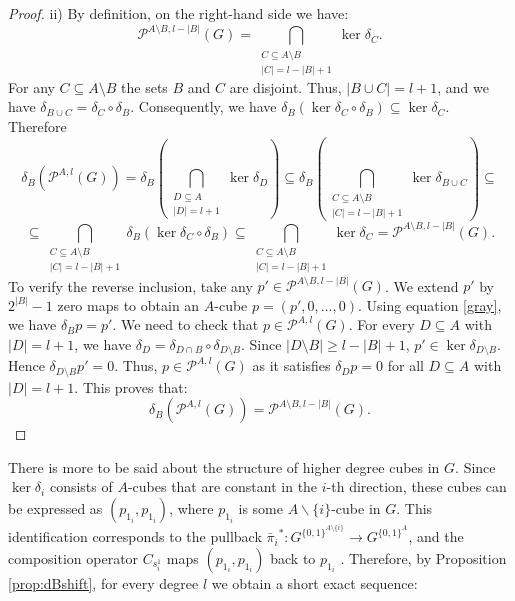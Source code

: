 \documentclass{amsart}
\theoremstyle{definition}
\theoremstyle{remark}
\numberwithin{equation}{section}
\begin{document}
\begin{proof}
ii) By definition, on the right-hand side we have:
$$ \mathcal{P}^{A\setminus B,l -|B|}(G) =  \bigcap_{\substack{C \subseteq A \setminus B \\  |C|=l-|B| +1}} \ker \delta_C.$$
For any $C \subseteq A\setminus B$ the sets $B$ and $C$ are disjoint. Thus, $|B \cup C|=l +1$, and we have $\delta_{B \cup C} = \delta_C \circ \delta_B$. Consequently, we have $\delta_B(\ker \delta_C \circ \delta_B) \subseteq \ker \delta_C$.
Therefore 
$$\delta_B \left(\mathcal{P}^{A,l}(G)\right) = \delta_B \left(  \bigcap_{\substack{D \subseteq A \\  |D|=l +1}} \ker \delta_{D} \right) \subseteq  \delta_B \left( \bigcap_{\substack{C \subseteq A \setminus B \\  |C|=l-|B| +1}} \ker \delta_{B \cup C} \right) \subseteq$$
$$\subseteq \bigcap_{\substack{C \subseteq A \setminus B \\  |C|=l-|B| +1}} \delta_B(\ker \delta_C \circ \delta_B) 
\subseteq \bigcap_{\substack{C \subseteq A \setminus B \\  |C|=l-|B| +1}} \ker \delta_C =  \mathcal{P}^{A\setminus B,l -|B|}(G).$$
To verify the reverse inclusion, take any $p' \in  \mathcal{P}^{A\setminus B,l -|B|}(G)$. We extend $p'$  by $2^{|B|}-1$ zero maps to obtain an  $A$-cube $p=(p', 0, \dots, 0)$. Using equation \eqref{gray}, we have $\delta_B p = p'$. We need to check that  $p \in \mathcal{P}^{A,l}(G)$. For every $D\subseteq A$ with $|D|=l+1$, we have $\delta_D= \delta_{D \cap B}\circ\delta_{D\setminus B}$.  Since $|D\setminus B|\ge l - |B| + 1$, $p' \in \ker \delta_{D\setminus B}$. Hence $\delta_{D\setminus B} p' = 0 $. Thus, $p \in \mathcal{P}^{A, l}(G)$ as it satisfies $ \delta_D p = 0$ for all $D \subseteq A$ with $|D| = l + 1$.
This proves that:
\[
\delta_B \left(\mathcal{P}^{A, l}(G)\right) = \mathcal{P}^{A \setminus B, l - |B|}(G).
\]

\end{proof}

There is more to be said about the structure of higher degree cubes in $G$.
Since $\ker \delta_i$ consists of $A$-cubes that are constant in the $i$-th direction, these cubes can be expressed as $(p_{1_i},p_{1_i})$, where $p_{1_i}$ is some $A\backslash \{i\}$-cube in $G$. This identification corresponds to the pullback ${\bar \pi_i}^* : G^{\{0,1\}^{A\setminus\{i\}}} \to G^{\{0,1\}^A}$, and the composition operator $C_{s^1_i}$ maps $(p_{1_i},p_{1_i})$ back to  $p_{1_i}$ . Therefore, by Proposition \ref{prop:dBshift}, for every degree $l$  we obtain a short exact sequence:
\end{document}
